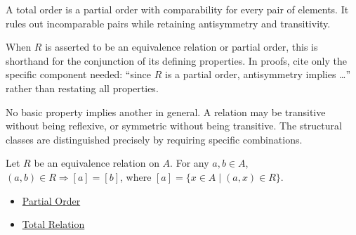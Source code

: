 \begin{remark*}[Interpretation]
A total order is a partial order with comparability for every pair of
elements. It rules out incomparable pairs while retaining antisymmetry and
transitivity.
\end{remark*}

\begin{remark*}[Exposition]
When $R$ is asserted to be an equivalence relation or partial order, this is
shorthand for the conjunction of its defining properties. In proofs, cite
only the specific component needed: ``since $R$ is a partial order,
antisymmetry implies \dots'' rather than restating all properties.
\end{remark*}

\begin{remark*}[Exposition]
No basic property implies another in general. A relation may be transitive
without being reflexive, or symmetric without being transitive. The structural
classes are distinguished precisely by requiring specific combinations.
\end{remark*}

\begin{example*}[Examples]
Let $R$ be an equivalence relation on $A$. For any $a,b \in A$,
$(a,b) \in R \Rightarrow [a] = [b]$, where $[a] = \{x \in A \mid (a,x) \in R\}$.
\end{example*}

\begin{dependencies}
\begin{itemize}
  \item \hyperref[def:partial-order]{Partial Order}
  \item \hyperref[def:total-rel]{Total Relation}
\end{itemize}
\end{dependencies}
